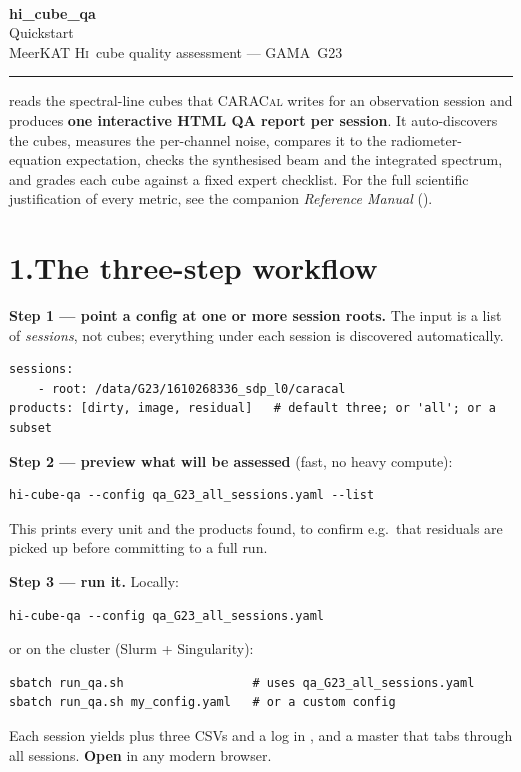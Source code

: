 \documentclass[11pt,a4paper]{article}
\begin{document}
\begin{center}
  {\hcqalogo[1.4]}\\[10pt]
  {\LARGE\bfseries\ttfamily hi\_cube\_qa}\\[4pt]
  {\large Quickstart}\\[6pt]
  {\normalsize MeerKAT \textsc{Hi}\ cube quality assessment --- GAMA~G23}
\end{center}
\noindent\rule{\textwidth}{0.6pt}
\vspace{4pt}

\noindent
{} reads the spectral-line cubes that \textsc{CARACal}
\citep{jozsa2020} writes for an observation session and produces \textbf{one
interactive HTML QA report per session}. It auto-discovers the cubes, measures
the per-channel noise, compares it to the radiometer-equation expectation,
checks the synthesised beam and the integrated spectrum, and grades each cube
against a fixed expert checklist. For the full scientific justification of every
metric, see the companion \emph{Reference Manual} ().

\section*{1.\quad The three-step workflow}

\textbf{Step 1 --- point a config at one or more session roots.}
The input is a list of \emph{sessions}, not cubes; everything under each session is discovered
automatically.
\begin{lstlisting}
sessions:
    - root: /data/G23/1610268336_sdp_l0/caracal
products: [dirty, image, residual]   # default three; or 'all'; or a subset
\end{lstlisting}

\textbf{Step 2 --- preview what will be assessed} (fast, no heavy compute):
\begin{lstlisting}
hi-cube-qa --config qa_G23_all_sessions.yaml --list
\end{lstlisting}
This prints every  unit and the products found, to
confirm e.g.\ that residuals are picked up before committing to a full run.

\textbf{Step 3 --- run it.} Locally:
\begin{lstlisting}
hi-cube-qa --config qa_G23_all_sessions.yaml
\end{lstlisting}
or on the cluster (Slurm + Singularity):
\begin{lstlisting}
sbatch run_qa.sh                  # uses qa_G23_all_sessions.yaml
sbatch run_qa.sh my_config.yaml   # or a custom config
\end{lstlisting}
Each session yields  plus three CSVs and a log in
, and a master  that tabs through all
sessions. \textbf{Open } in any modern browser.
\end{document}
